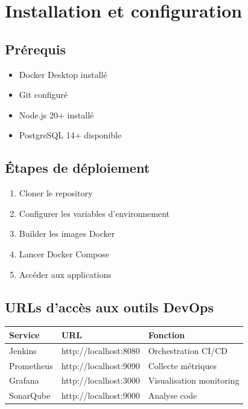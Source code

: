 \documentclass[12pt,a4paper]{report}
\begin{document}
\section{Installation et configuration}

\subsection{Prérequis}

\begin{itemize}
    \item Docker Desktop installé
    \item Git configuré
    \item Node.js 20+ installé
    \item PostgreSQL 14+ disponible
\end{itemize}

\subsection{Étapes de déploiement}

\begin{enumerate}
    \item Cloner le repository
    \item Configurer les variables d'environnement
    \item Builder les images Docker
    \item Lancer Docker Compose
    \item Accéder aux applications
\end{enumerate}

\subsection{URLs d'accès aux outils DevOps}

\begin{table}[h]
\centering
\begin{tabular}{|l|l|l|}
\hline
\textbf{Service} & \textbf{URL} & \textbf{Fonction} \\
\hline
Jenkins & http://localhost:8080 & Orchestration CI/CD \\
Prometheus & http://localhost:9090 & Collecte métriques \\
Grafana & http://localhost:3000 & Visualisation monitoring \\
SonarQube & http://localhost:9000 & Analyse code \\
\hline
\end{tabular}
\end{table}
\end{document}
